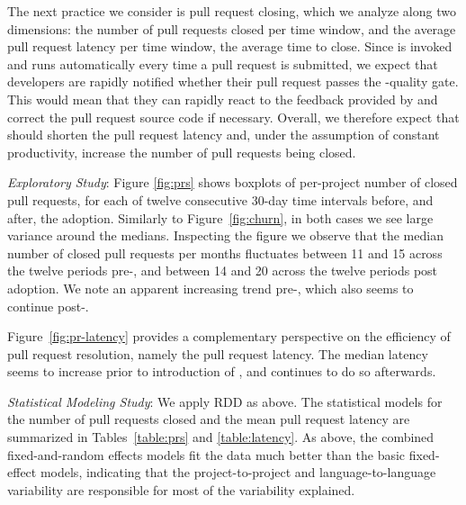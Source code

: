 

The next practice we consider is pull request closing, which we analyze along two 
dimensions: the number of pull requests closed per time window, and the average
pull request latency per time window, \ie the average time to close.
Since \Tvis is invoked and runs automatically every time a pull request is submitted, 
we expect that developers are rapidly notified whether their pull request passes the 
\Tvi-quality gate.
This would mean that they can rapidly react to the feedback provided by \Tvi and 
correct the pull request source code if necessary.
Overall, we therefore expect that \Tvis should shorten the pull request latency and, 
under the assumption of constant productivity, increase the number of pull requests 
being closed.

\smallskip\noindent \emph{Exploratory Study}:
Figure
\ref{fig:prs} shows boxplots of per-project number of closed pull requests, for each 
of twelve consecutive 30-day time intervals before, and after, the \Tvis adoption. 
Similarly to Figure~\ref{fig:churn}, in both cases we see large variance around the 
medians. 
Inspecting the figure we observe that the median number of closed pull requests 
per months fluctuates between 11 and 15 across the twelve periods pre-\Tvi, and 
between 14 and 20 across the twelve periods post adoption.
We note an apparent increasing trend pre-\Tvi, which also seems to continue post-\Tvi.

Figure~\ref{fig:pr-latency} provides a complementary perspective on the efficiency 
of pull request resolution, namely the pull request latency.
The median latency seems to increase prior to introduction of \Tvis, and continues
to do so afterwards. %

\smallskip\noindent \emph{Statistical Modeling Study}:
We apply RDD as above. 
The statistical models for the number of pull requests closed and the mean pull 
request latency are summarized in Tables~\ref{table:prs} and \ref{table:latency}.
As above, the combined fixed-and-random effects models fit the data much 
better than the basic fixed-effect models, indicating that the project-to-project 
and language-to-language variability are responsible for most of the variability 
explained.

